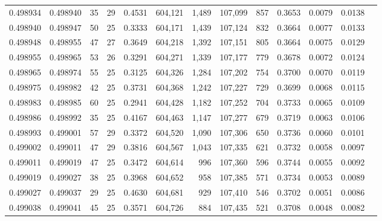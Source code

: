 \begin{tabular}{rrrrrrrrrrrrr}
0.498934 & 0.498940 &  35 &  29 &                                     0.4531 & 604,121 &   1,489 & 107,099 &     857 & 0.3653 & 0.0079 & 0.0138 \\
0.498940 & 0.498947 &  50 &  25 &                                     0.3333 & 604,171 &   1,439 & 107,124 &     832 & 0.3664 & 0.0077 & 0.0133 \\
0.498948 & 0.498955 &  47 &  27 &                                     0.3649 & 604,218 &   1,392 & 107,151 &     805 & 0.3664 & 0.0075 & 0.0129 \\
0.498955 & 0.498965 &  53 &  26 &                                     0.3291 & 604,271 &   1,339 & 107,177 &     779 & 0.3678 & 0.0072 & 0.0124 \\
0.498965 & 0.498974 &  55 &  25 &                                     0.3125 & 604,326 &   1,284 & 107,202 &     754 & 0.3700 & 0.0070 & 0.0119 \\
0.498975 & 0.498982 &  42 &  25 &                                     0.3731 & 604,368 &   1,242 & 107,227 &     729 & 0.3699 & 0.0068 & 0.0115 \\
0.498983 & 0.498985 &  60 &  25 &                                     0.2941 & 604,428 &   1,182 & 107,252 &     704 & 0.3733 & 0.0065 & 0.0109 \\
0.498986 & 0.498992 &  35 &  25 &                                     0.4167 & 604,463 &   1,147 & 107,277 &     679 & 0.3719 & 0.0063 & 0.0106 \\
0.498993 & 0.499001 &  57 &  29 &                                     0.3372 & 604,520 &   1,090 & 107,306 &     650 & 0.3736 & 0.0060 & 0.0101 \\
0.499002 & 0.499011 &  47 &  29 &                                     0.3816 & 604,567 &   1,043 & 107,335 &     621 & 0.3732 & 0.0058 & 0.0097 \\
0.499011 & 0.499019 &  47 &  25 &                                     0.3472 & 604,614 &     996 & 107,360 &     596 & 0.3744 & 0.0055 & 0.0092 \\
0.499019 & 0.499027 &  38 &  25 &                                     0.3968 & 604,652 &     958 & 107,385 &     571 & 0.3734 & 0.0053 & 0.0089 \\
0.499027 & 0.499037 &  29 &  25 &                                     0.4630 & 604,681 &     929 & 107,410 &     546 & 0.3702 & 0.0051 & 0.0086 \\
0.499038 & 0.499041 &  45 &  25 &                                     0.3571 & 604,726 &     884 & 107,435 &     521 & 0.3708 & 0.0048 & 0.0082 \\

\end{tabular}
